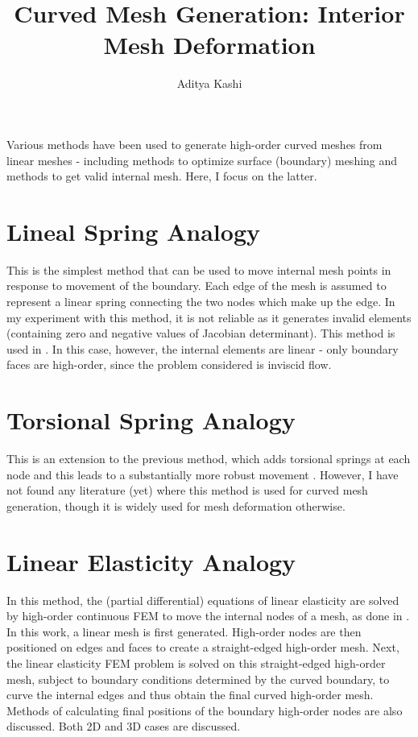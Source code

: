 \documentclass[letterpaper,twoside,11pt]{article}
\title{Curved Mesh Generation: Interior Mesh Deformation}
\author{Aditya Kashi}
\begin{document}
\maketitle

Various methods have been used to generate high-order curved meshes from linear meshes - including methods to optimize surface (boundary) meshing and methods to get valid internal mesh. Here, I focus on the latter.

\section{Lineal Spring Analogy}
This is the simplest method that can be used to move internal mesh points in response to movement of the boundary. Each edge of the mesh is assumed to represent a linear spring connecting the two nodes which make up the edge. In my experiment with this method, it is not reliable as it generates invalid elements (containing zero and negative values of Jacobian determinant). This method is used in \cite{mavriplis}. In this case, however, the internal elements are linear - only boundary faces are high-order, since the problem considered is inviscid flow.

\section{Torsional Spring Analogy}
This is an extension to the previous method, which adds torsional springs at each node and this leads to a substantially more robust movement \cite{farhat}. However, I have not found any literature (yet) where this method is used for curved mesh generation, though it is widely used for mesh deformation otherwise.

\section{Linear Elasticity Analogy}
In this method, the (partial differential) equations of linear elasticity are solved by high-order continuous FEM to move the internal nodes of a mesh, as done in \cite{xie}. In this work, a linear mesh is first generated. High-order nodes are then positioned on edges and faces to create a straight-edged high-order mesh. Next, the linear elasticity FEM problem is solved on this straight-edged high-order mesh, subject to boundary conditions determined by the curved boundary, to curve the internal edges and thus obtain the final curved high-order mesh. Methods of calculating final positions of the boundary high-order nodes are also discussed. Both 2D and 3D cases are discussed.
\end{document}
